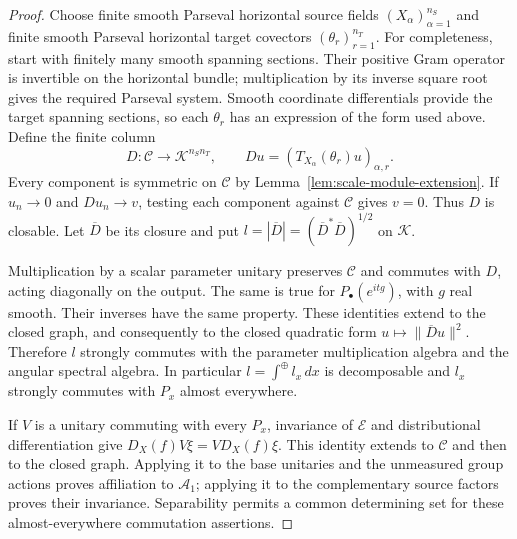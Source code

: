 \begin{proof}
Choose finite smooth Parseval horizontal source fields
$(X_\alpha)_{\alpha=1}^{n_S}$ and finite smooth Parseval horizontal
target covectors $(\theta_r)_{r=1}^{n_T}$.
For completeness, start with finitely many smooth spanning sections.
Their positive Gram operator is invertible on the horizontal bundle;
multiplication by its inverse square root gives the required Parseval
system.  Smooth coordinate differentials provide the target spanning
sections, so each $\theta_r$ has an expression of the form used above.
Define the finite column
\[
 D:\mathcal C\longrightarrow\mathcal K^{n_Sn_T},\qquad
 Du=(T_{X_\alpha}(\theta_r)u)_{\alpha,r}.
\]
Every component is symmetric on $\mathcal C$ by
Lemma~\ref{lem:scale-module-extension}.  If $u_n\to0$ and
$Du_n\to v$, testing each component against $\mathcal C$ gives $v=0$.
Thus $D$ is closable.  Let $\overline D$ be its closure and put
$l=|\overline D|=(\overline D^*\overline D)^{1/2}$ on $\mathcal K$.

Multiplication by a scalar parameter unitary preserves $\mathcal C$
and commutes with $D$, acting diagonally on the output.  The same is
true for $P_{\bullet}(e^{it g})$, with $g$ real smooth.  Their inverses
have the same property.  These identities extend to the closed graph,
and consequently to the closed quadratic form
$u\mapsto\|\overline D u\|^2$.  Therefore $l$ strongly commutes with
the parameter multiplication algebra and the angular spectral algebra.
In particular $l=\int^{\oplus}l_x\,dx$ is decomposable and $l_x$
strongly commutes with $P_x$ almost everywhere.

If $V$ is a unitary commuting with every $P_x$, invariance of
$\mathscr E$ and distributional differentiation give
$D_X(f)V\xi=VD_X(f)\xi$.  This identity extends to $\mathcal C$ and
then to the closed graph.  Applying it to the base unitaries and the
unmeasured group actions proves affiliation to $\mathcal A_1$;
applying it to the complementary source factors proves their
invariance.  Separability permits a common determining set for these
almost-everywhere commutation assertions.


\end{proof}
